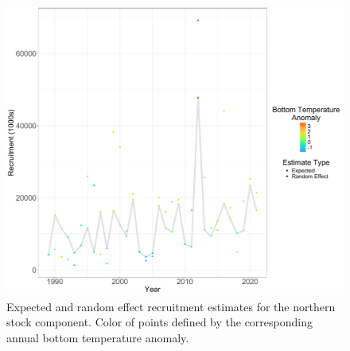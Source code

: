 \documentclass[
]{article}
\begin{document}
\begin{figure}

{\centering \includegraphics[width=1\linewidth]{best_R_Ecov} 

}

\caption{Expected and random effect recruitment estimates for the northern stock component. Color of points defined by the corresponding annual bottom temperature anomaly.}\label{fig:BT-Ecov-R}
\end{figure}
\pagebreak
\end{document}
